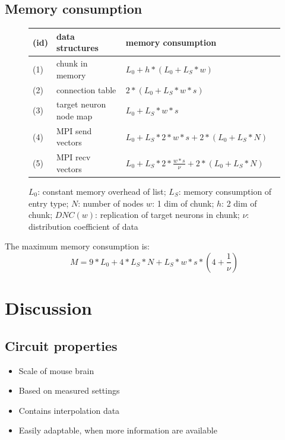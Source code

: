 \documentclass[a4paper]{article}
\begin{document}
\subsection{Memory consumption}
\begin{figure}[ht!]
\begin{tabular}{| l | l | l | l |}
    \hline
    (id) & data structures & memory consumption \\ \hline
    (1) & chunk in memory & $L_0 + h*(L_0 + L_S*w)$ \\ \hline
    (2) & connection table & $2*(L_0+L_S*w*s)$ \\ \hline
    (3) & target neuron node map & $L_0+L_S*w*s$ \\ \hline
    (4) & MPI send vectors & $L_0+L_S*2*w*s+2*(L_0+L_S*N)$ \\ \hline
    (5) & MPI recv vectors & $L_0+L_S*2*\frac{w*s}{\nu}+2*(L_0+L_S*N)$ \\ \hline
    \end{tabular}
\caption{$L_0$: constant memory overhead of list; $L_S$: memory consumption of entry type; $N$: number of nodes $w$: 1 dim of chunk; $h$: 2 dim of chunk; $DNC(w)$: replication of target neurons in chunk; $\nu$: distribution coefficient of data}
\end{figure}
The maximum memory consumption is:
\begin{equation}
  M = 9*L_0 + 4*L_S*N+L_S*w*s*(4+\frac{1}{\nu})
  \label{eq:maxmemoryconsumption}
\end{equation}

\newpage
\section{Discussion}
\subsection{Circuit properties}

\begin{itemize}
      \item Scale of mouse brain
      \item Based on measured settings
      \item Contains interpolation data
      \item Easily adaptable, when more information are available
\end{itemize}
\end{document}
